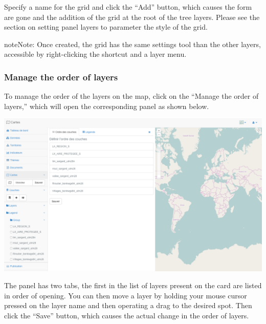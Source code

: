 \documentclass[letterpaper,10pt,english]{sphinxmanual}
\begin{document}

Specify a name for the grid and click the ``Add'' button, which causes the form are gone and the addition of the grid at the root of the tree layers. Please see the section on setting panel layers to parameter the style of the grid.

\begin{notice}{note}{Note:}
Once created, the grid has the same settings tool than the other layers, accessible by right-clicking the shortcut and a layer menu.
\end{notice}


\subsubsection{Manage the order of layers}
\label{maps/layerstree:gerer-l-ordre-des-couches}
To manage the order of the layers on the map, click on the ``Manage the order of layers,'' which will open the corresponding panel as shown below.

\includegraphics[width=1.000\linewidth]{set-layer-order-window.png}

The panel has two tabs, the first in the list of layers present on the card are listed in order of opening. You can then move a layer by holding your mouse cursor pressed on the layer name and then operating a drag to the desired spot. Then click the ``Save'' button, which causes the actual change in the order of layers.
\end{document}
